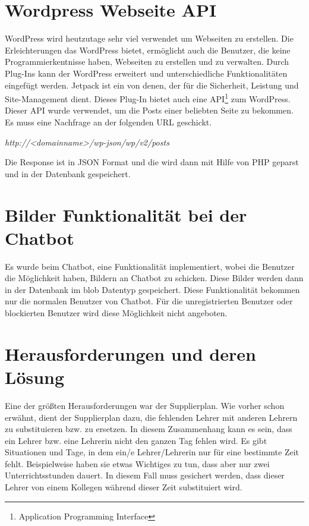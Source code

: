\section{Wordpress Webseite API}


WordPress wird heutzutage sehr viel verwendet um Webseiten zu erstellen. Die Erleichterungen das WordPress bietet, ermöglicht auch die Benutzer, die keine Programmierkentnisse haben, Webseiten zu erstellen und zu verwalten. Durch Plug-Ins kann der WordPress erweitert und unterschiedliche Funktionalitäten eingefügt werden. Jetpack ist ein von denen, der für die Sicherheit, Leistung und Site-Management dient. Dieses Plug-In bietet auch eine API\footnote{Application Programming Interface} zum WordPress. Dieser API wurde verwendet, um die Posts einer beliebten Seite zu bekommen. Es muss eine Nachfrage an der folgenden URL geschickt.


\begin{center}
	\textit{http://\textless{}\textit{domainname}\textgreater{}/wp-json/wp/v2/posts}
	
\end{center}


Die Response ist in JSON Format und die wird dann mit Hilfe von PHP geparst und in der Datenbank gespeichert. 

\section{Bilder Funktionalität bei der Chatbot}
Es wurde beim Chatbot, eine Funktionalität implementiert, wobei die Benutzer die Möglichkeit haben, Bildern an Chatbot zu schicken. Diese Bilder werden dann in der Datenbank im blob Datentyp gespeichert. Diese Funktionalität bekommen nur die normalen Benutzer von Chatbot. Für die unregistrierten Benutzer oder blockierten Benutzer wird diese Möglichkeit nicht angeboten.

\section{Herausforderungen und deren Lösung}

Eine der größten Herausforderungen war der Supplierplan. Wie vorher schon erwähnt, dient der Supplierplan  dazu, die fehlenden Lehrer mit anderen Lehrern zu substituieren bzw. zu ersetzen. In diesem Zusammenhang kann es sein, dass ein Lehrer bzw. eine Lehrerin nicht den ganzen Tag fehlen wird. Es gibt Situationen und Tage, in dem ein/e Lehrer/Lehrerin nur für eine bestimmte Zeit fehlt. Beispielweise haben sie etwas Wichtiges zu tun, dass aber nur zwei Unterrichtsstunden dauert. In diesem Fall muss gesichert werden, dass dieser Lehrer von einem Kollegen während dieser Zeit substituiert wird.


